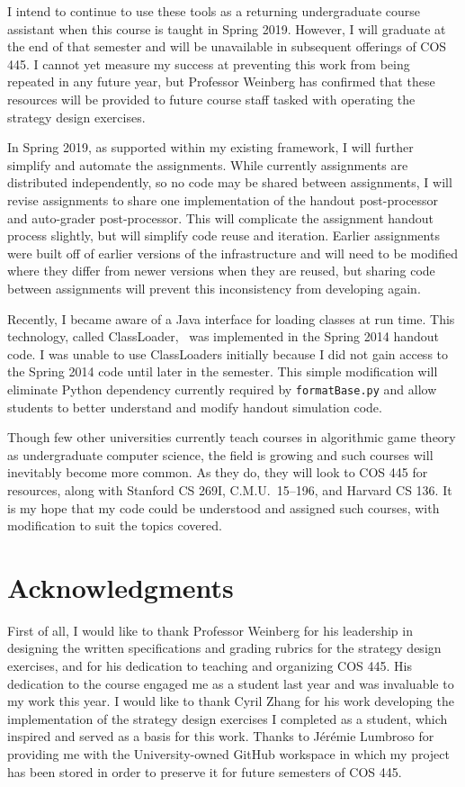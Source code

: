 \documentclass[pageno]{jpaper}
\begin{document}
I intend to continue to use these tools as a returning undergraduate course assistant when this course is taught in Spring 2019.
However, I will graduate at the end of that semester and will be unavailable in subsequent offerings of COS 445.
I cannot yet measure my success at preventing this work from being repeated in any future year, but Professor Weinberg has confirmed that these resources will be provided to future course staff tasked with operating the strategy design exercises.

In Spring 2019, as supported within my existing framework, I will further simplify and automate the assignments.
While currently assignments are distributed independently, so no code may be shared between assignments, I will revise assignments to share one implementation of the handout post-processor and auto-grader post-processor.
This will complicate the assignment handout process slightly, but will simplify code reuse and iteration.
Earlier assignments were built off of earlier versions of the infrastructure and will need to be modified where they differ from newer versions when they are reused, but sharing code between assignments will prevent this inconsistency from developing again.

Recently, I became aware of a Java interface for loading classes at run time.
This technology, called ClassLoader,~\cite{https://docs.oracle.com/javase/9/docs/api/java/lang/ClassLoader.html} was implemented in the Spring 2014 handout code.
I was unable to use ClassLoaders initially because I did not gain access to the Spring 2014 code until later in the semester.
This simple modification will eliminate Python dependency currently required by \texttt{formatBase.py} and allow students to better understand and modify handout simulation code.

Though few other universities currently teach courses in algorithmic game theory as undergraduate computer science, the field is growing and such courses will inevitably become more common.
As they do, they will look to COS 445 for resources, along with Stanford CS 269I, C.M.U.\ 15--196, and Harvard CS 136.
It is my hope that my code could be understood and assigned such courses, with modification to suit the topics covered.

\section*{Acknowledgments}
First of all, I would like to thank Professor Weinberg for his leadership in designing the written specifications and grading rubrics for the strategy design exercises, and for his dedication to teaching and organizing COS 445.
His dedication to the course engaged me as a student last year and was invaluable to my work this year.
I would like to thank Cyril Zhang for his work developing the implementation of the strategy design exercises I completed as a student, which inspired and served as a basis for this work.
Thanks to J\'er\'emie Lumbroso for providing me with the University-owned GitHub workspace in which my project has been stored in order to preserve it for future semesters of COS 445.
\end{document}
